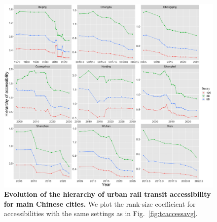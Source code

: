 \begin{figure}
	\includegraphics[width=\textwidth]{figures/accesshierarchy_facet.png}
	\caption{\textbf{Evolution of the hierarchy of urban rail transit accessibility for main Chinese cities.} We plot the rank-size coefficient for accessibilities with the same settings as in Fig.~\ref{fig:tcaccessavg}. \label{fig:tcaccesshierarchy}}
\end{figure}




